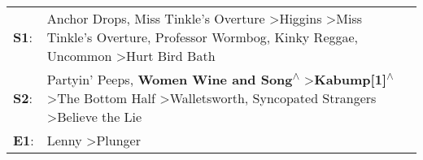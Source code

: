 \begin{supertabular}{p{0.03\textwidth}p{0.92\textwidth}}
 \textbf{S1}:  &         Anchor Drops\textsuperscript{}, \enspace Miss Tinkle's Overture\textsuperscript{} \textgreater \enspace Higgins\textsuperscript{} \textgreater \enspace Miss Tinkle's Overture\textsuperscript{}, \enspace Professor Wormbog\textsuperscript{}, \enspace Kinky Reggae\textsuperscript{}, \enspace Uncommon\textsuperscript{} \textgreater \enspace Hurt Bird Bath\textsuperscript{}  \enspace  \\
 \textbf{S2}:  &  Partyin' Peeps\textsuperscript{}, \enspace \textbf{Women Wine and Song\textsuperscript{$\wedge$}} \textgreater \enspace \textbf{Kabump[1]\textsuperscript{$\wedge$}} \textgreater \enspace The Bottom Half\textsuperscript{} \textgreater \enspace Walletsworth\textsuperscript{}, \enspace Syncopated Strangers\textsuperscript{} \textgreater \enspace Believe the Lie\textsuperscript{}  \enspace  \\
 \textbf{E1}:  &                                                                                                                                                                                                                                                                                                                     Lenny\textsuperscript{} \textgreater \enspace Plunger\textsuperscript{}  \enspace  \\
\end{supertabular}
